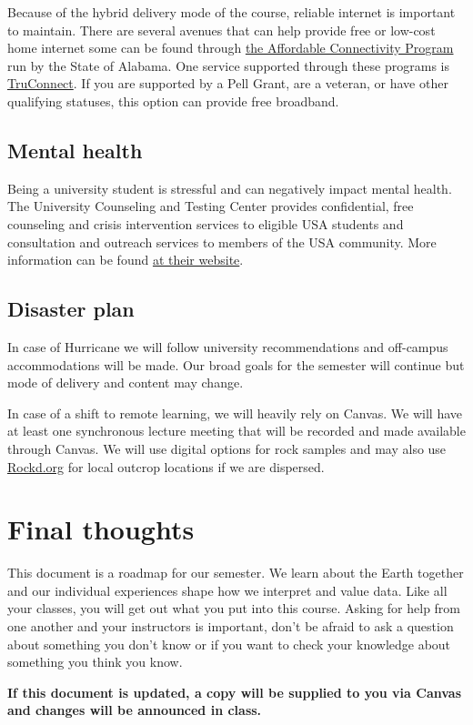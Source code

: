 \documentclass[11pt,]{article}
\begin{document}
Because of the hybrid delivery mode of the course, reliable internet is
important to maintain. There are several avenues that can help provide
free or low-cost home internet some can be found through
\href{https://adeca.alabama.gov/affordable-connectivity-program/}{the
Affordable Connectivity Program} run by the State of Alabama. One
service supported through these programs is
\href{https://www.truconnect.com/findhelp}{TruConnect}. If you are
supported by a Pell Grant, are a veteran, or have other qualifying
statuses, this option can provide free broadband.

\hypertarget{mental-health}{%
\subsection{Mental health}\label{mental-health}}

Being a university student is stressful and can negatively impact mental
health. The University Counseling and Testing Center provides
confidential, free counseling and crisis intervention services to
eligible USA students and consultation and outreach services to members
of the USA community. More information can be found
\href{https://www.southalabama.edu/departments/counseling/}{at their
website}.

\hypertarget{disaster-plan}{%
\subsection{Disaster plan}\label{disaster-plan}}

In case of Hurricane we will follow university recommendations and
off-campus accommodations will be made. Our broad goals for the semester
will continue but mode of delivery and content may change.

In case of a shift to remote learning, we will heavily rely on Canvas.
We will have at least one synchronous lecture meeting that will be
recorded and made available through Canvas. We will use digital options
for rock samples and may also use \href{https://rockd.org/}{Rockd.org}
for local outcrop locations if we are dispersed.

\hypertarget{final-thoughts}{%
\section{Final thoughts}\label{final-thoughts}}

This document is a roadmap for our semester. We learn about the Earth
together and our individual experiences shape how we interpret and value
data. Like all your classes, you will get out what you put into this
course. Asking for help from one another and your instructors is
important, don't be afraid to ask a question about something you don't
know or if you want to check your knowledge about something you think
you know.

\textbf{If this document is updated, a copy will be supplied to you via
Canvas and changes will be announced in class.}
\end{document}

